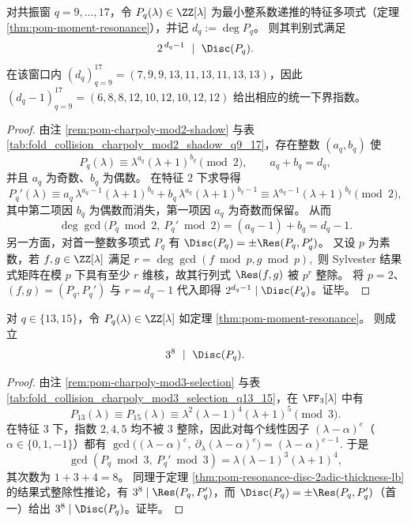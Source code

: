 \begin{theorem}\label{thm:pom-resonance-disc-2adic-thickness-lb}
对共振窗 \(q=9,\dots,17\)，令 \(P_q(\lambda)\in\ZZ[\lambda]\) 为最小整系数递推的特征多项式（定理 \ref{thm:pom-moment-resonance}），并记 \(d_q:=\deg P_q\)。
则其判别式满足
\[
2^{\,d_q-1}\ \mid\ \Disc(P_q).
\]
在该窗口内 \((d_q)_{q=9}^{17}=(7,9,9,13,11,13,11,13,13)\)，因此 \((d_q-1)_{q=9}^{17}=(6,8,8,12,10,12,10,12,12)\) 给出相应的统一下界指数。
\end{theorem}
\begin{proof}
由注 \ref{rem:pom-charpoly-mod2-shadow} 与表 \ref{tab:fold_collision_charpoly_mod2_shadow_q9_17}，存在整数 \((a_q,b_q)\) 使
\[
P_q(\lambda)\equiv \lambda^{a_q}(\lambda+1)^{b_q}\pmod 2,\qquad a_q+b_q=d_q,
\]
并且 \(a_q\) 为奇数、\(b_q\) 为偶数。
在特征 \(2\) 下求导得
\[
P_q'(\lambda)\equiv a_q\,\lambda^{a_q-1}(\lambda+1)^{b_q}+b_q\,\lambda^{a_q}(\lambda+1)^{b_q-1}
\equiv \lambda^{a_q-1}(\lambda+1)^{b_q}\pmod 2,
\]
其中第二项因 \(b_q\) 为偶数而消失，第一项因 \(a_q\) 为奇数而保留。
从而
\[
\deg \gcd\!\bigl(P_q\bmod 2,\ P_q'\bmod 2\bigr)=(a_q-1)+b_q=d_q-1.
\]
另一方面，对首一整数多项式 \(P_q\) 有 \(\Disc(P_q)=\pm\Res(P_q,P_q')\)。
又设 \(p\) 为素数，若 \(f,g\in\ZZ[\lambda]\) 满足
\(
r=\deg\gcd(f\bmod p,g\bmod p),
\)
则 Sylvester 结果式矩阵在模 \(p\) 下具有至少 \(r\) 维核，故其行列式 \(\Res(f,g)\) 被 \(p^r\) 整除。
将 \(p=2\)、\((f,g)=(P_q,P_q')\) 与 \(r=d_q-1\) 代入即得 \(2^{d_q-1}\mid\Disc(P_q)\)。证毕。
\end{proof}

\begin{theorem}\label{thm:pom-resonance-disc-3adic-q13-15}
对 \(q\in\{13,15\}\)，令 \(P_q(\lambda)\in\ZZ[\lambda]\) 如定理 \ref{thm:pom-moment-resonance}。
则成立
\[
3^{8}\ \mid\ \Disc(P_q).
\]
\end{theorem}
\begin{proof}
由注 \ref{rem:pom-charpoly-mod3-selection} 与表 \ref{tab:fold_collision_charpoly_mod3_selection_q13_15}，在 \(\FF_3[\lambda]\) 中有
\[
P_{13}(\lambda)\equiv P_{15}(\lambda)\equiv \lambda^{2}(\lambda-1)^4(\lambda+1)^5\pmod 3.
\]
在特征 \(3\) 下，指数 \(2,4,5\) 均不被 \(3\) 整除，因此对每个线性因子 \((\lambda-\alpha)^e\)（\(\alpha\in\{0,1,-1\}\)）都有
\(
\gcd\bigl((\lambda-\alpha)^e,\ \partial_\lambda(\lambda-\alpha)^e\bigr)=(\lambda-\alpha)^{e-1}.
\)
于是
\[
\gcd(P_q\bmod 3,\ P_q'\bmod 3)=\lambda(\lambda-1)^3(\lambda+1)^4,
\]
其次数为 \(1+3+4=8\)。
同理于定理 \ref{thm:pom-resonance-disc-2adic-thickness-lb} 的结果式整除性推论，有 \(3^{8}\mid\Res(P_q,P_q')\)，而 \(\Disc(P_q)=\pm\Res(P_q,P_q')\)（首一）给出 \(3^8\mid\Disc(P_q)\)。证毕。
\end{proof}

